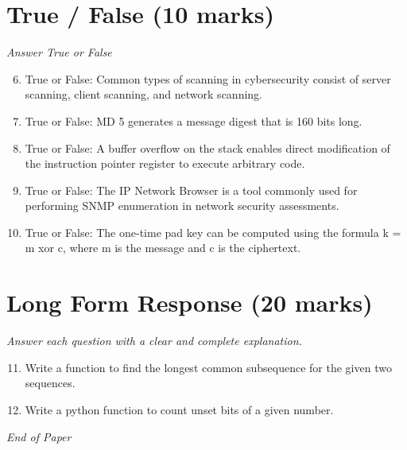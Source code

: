 \documentclass[12pt]{article}
\begin{document}
\section*{True / False (10 marks)}
\textit{Answer True or False}
\begin{enumerate}[label=\arabic*.]
\setcounter{enumi}{5}
\item True or False: Common types of scanning in cybersecurity consist of server scanning, client scanning, and network scanning.
\item True or False: MD 5 generates a message digest that is 160 bits long.
\item True or False: A buffer overflow on the stack enables direct modification of the instruction pointer register to execute arbitrary code.
\item True or False: The IP Network Browser is a tool commonly used for performing SNMP enumeration in network security assessments.
\item True or False: The one-time pad key can be computed using the formula k = m xor c, where m is the message and c is the ciphertext.
\end{enumerate}

\section*{Long Form Response (20 marks)}
\textit{Answer each question with a clear and complete explanation.}
\begin{enumerate}[label=\arabic*.]
\setcounter{enumi}{10}
\item Write a function to find the longest common subsequence for the given two sequences.
\item Write a python function to count unset bits of a given number.
\end{enumerate}

\vfill
\noindent\textit{End of Paper}
\end{document}
